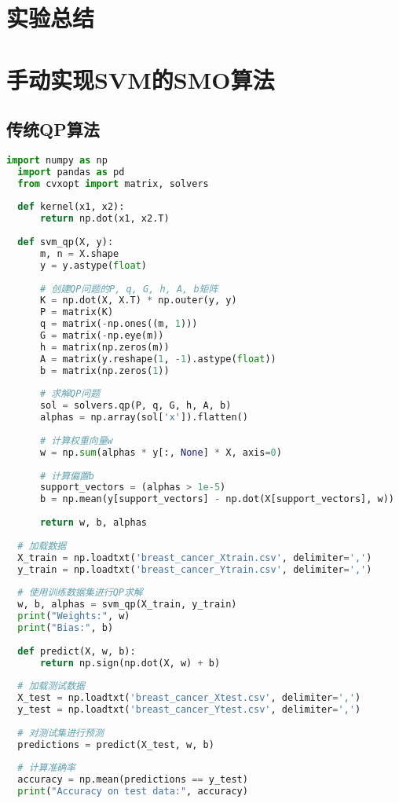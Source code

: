 \documentclass[12pt]{article}
\begin{document}
\section{实验总结}


\newpage
\appendix
\section{手动实现SVM的SMO算法}
\subsection{传统QP算法}
\begin{lstlisting}[language=Python]
  import numpy as np
  import pandas as pd
  from cvxopt import matrix, solvers
  
  def kernel(x1, x2):
      return np.dot(x1, x2.T)
  
  def svm_qp(X, y):
      m, n = X.shape
      y = y.astype(float)
      
      # 创建QP问题的P, q, G, h, A, b矩阵
      K = np.dot(X, X.T) * np.outer(y, y)
      P = matrix(K)
      q = matrix(-np.ones((m, 1)))
      G = matrix(-np.eye(m))
      h = matrix(np.zeros(m))
      A = matrix(y.reshape(1, -1).astype(float))
      b = matrix(np.zeros(1))
  
      # 求解QP问题
      sol = solvers.qp(P, q, G, h, A, b)
      alphas = np.array(sol['x']).flatten()
      
      # 计算权重向量w
      w = np.sum(alphas * y[:, None] * X, axis=0)
      
      # 计算偏置b
      support_vectors = (alphas > 1e-5)
      b = np.mean(y[support_vectors] - np.dot(X[support_vectors], w))
      
      return w, b, alphas
  
  # 加载数据
  X_train = np.loadtxt('breast_cancer_Xtrain.csv', delimiter=',')
  y_train = np.loadtxt('breast_cancer_Ytrain.csv', delimiter=',')
  
  # 使用训练数据集进行QP求解
  w, b, alphas = svm_qp(X_train, y_train)
  print("Weights:", w)
  print("Bias:", b)
  
  def predict(X, w, b):
      return np.sign(np.dot(X, w) + b)
  
  # 加载测试数据
  X_test = np.loadtxt('breast_cancer_Xtest.csv', delimiter=',')
  y_test = np.loadtxt('breast_cancer_Ytest.csv', delimiter=',')
  
  # 对测试集进行预测
  predictions = predict(X_test, w, b)
  
  # 计算准确率
  accuracy = np.mean(predictions == y_test)
  print("Accuracy on test data:", accuracy)
    
\end{lstlisting}
\end{document}
